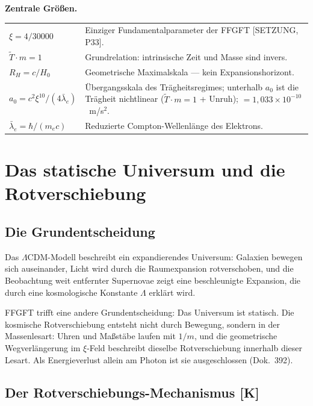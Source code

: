 \medskip
\noindent\textbf{Zentrale Größen.}

\medskip
\begin{tabular}{@{}lp{10.5cm}}
$\xi = 4/30000$          & Einziger Fundamentalparameter der FFGFT
                           [SETZUNG, P33]. \\[4pt]
$\tilde T \cdot m = 1$   & Grundrelation: intrinsische Zeit und Masse
                           sind invers. \\[4pt]
$R_H = c/H_0$            & Geometrische Maximalskala — kein Expansionshorizont. \\[4pt]
$a_0 = c^2\xi^{10}/(4\bar\lambda_e)$
                         & Übergangsskala des Trägheitsregimes;
                           unterhalb $a_0$ ist die Trägheit nichtlinear
                           ($\tilde T\cdot m=1$ + Unruh);
                           $= 1{,}033\times10^{-10}$~m/s$^2$. \\[4pt]
$\bar\lambda_e = \hbar/(m_e c)$
                         & Reduzierte Compton-Wellenlänge des Elektrons. \\
\end{tabular}

\chapter{Das statische Universum und die Rotverschiebung}

\section{Die Grundentscheidung}

Das $\Lambda$CDM-Modell beschreibt ein expandierendes Universum: Galaxien
bewegen sich auseinander, Licht wird durch die Raumexpansion rotverschoben,
und die Beobachtung weit entfernter Supernovae zeigt eine beschleunigte
Expansion, die durch eine kosmologische Konstante $\Lambda$ erklärt wird.

FFGFT trifft eine andere Grundentscheidung: Das Universum ist statisch.
Die kosmische Rotverschiebung entsteht nicht durch Bewegung, sondern in der
Massenlesart: Uhren und Maßstäbe laufen mit $1/m$, und die geometrische
Wegverlängerung im $\xi$-Feld beschreibt dieselbe Rotverschiebung innerhalb
dieser Lesart. Als Energieverlust allein am Photon ist sie ausgeschlossen
(Dok.~392).

\section{Der Rotverschiebungs-Mechanismus [K]}

